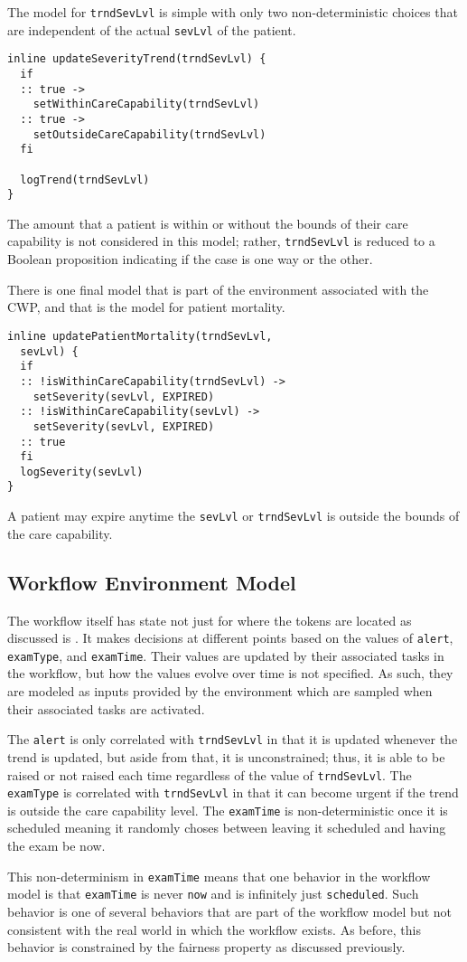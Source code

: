 The model for \texttt{trndSevLvl} is simple with only two non-deterministic choices that are independent of the actual \texttt{sevLvl} of the patient. 
%
{\small
\begin{lstlisting}[style=myPromela]
inline updateSeverityTrend(trndSevLvl) {
  if
  :: true -> 
    setWithinCareCapability(trndSevLvl)
  :: true -> 
    setOutsideCareCapability(trndSevLvl)
  fi

  logTrend(trndSevLvl)
}
\end{lstlisting}
}
%
\noindent The amount that a patient is within or without the bounds of their care capability is not considered in this model; rather, \texttt{trndSevLvl} is reduced to a Boolean proposition indicating if the case is one way or the other.

There is one final model that is part of the environment associated with the CWP, and that is the model for patient mortality. 
%
{\small
\begin{lstlisting}[style=myPromela]
inline updatePatientMortality(trndSevLvl, 
  sevLvl) {
  if
  :: !isWithinCareCapability(trndSevLvl) -> 
    setSeverity(sevLvl, EXPIRED)
  :: !isWithinCareCapability(sevLvl) ->
    setSeverity(sevLvl, EXPIRED)
  :: true
  fi
  logSeverity(sevLvl)
}
\end{lstlisting}
}
%
\noindent A patient may expire anytime the \texttt{sevLvl} or \texttt{trndSevLvl} is outside the bounds of the care capability.

\subsection{Workflow Environment Model}

 The workflow itself has state not just for where the tokens are located as discussed is . It makes decisions at different points based on the values of \texttt{alert}, \texttt{examType}, and \texttt{examTime}. Their values are updated by their associated tasks in the workflow, but how the values evolve over time is not specified. As such, they are modeled as inputs provided by the environment which are sampled when their associated tasks are activated.

The \texttt{alert} is only correlated with \texttt{trndSevLvl} in that it is updated whenever the trend is updated, but aside from that, it is unconstrained; thus, it is able to be raised or not raised each time regardless of the value of \texttt{trndSevLvl}. The \texttt{examType} is correlated with \texttt{trndSevLvl} in that it can become urgent if the trend is outside the care capability level. The \texttt{examTime} is non-deterministic once it is scheduled meaning it randomly choses between leaving it scheduled and having the exam be now.

This non-determinism in \texttt{examTime} means that one behavior in the workflow model is that \texttt{examTime} is never \texttt{now} and is infinitely just \texttt{scheduled}. Such behavior is one of several behaviors that are part of the workflow model but not consistent with the real world in which the workflow exists. As before, this behavior is constrained by the fairness property as discussed previously.
